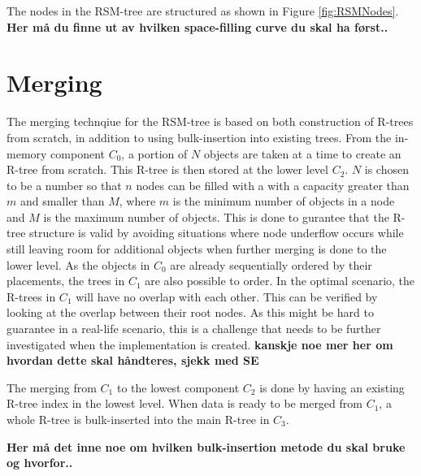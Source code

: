 The nodes in the RSM-tree are structured as shown in Figure \ref{fig:RSMNodes}. \textbf{Her må du finne ut av hvilken space-filling curve du skal ha først..} 

\section{Merging}
\label{RSM-Merging}
The merging technqiue for the RSM-tree is based on both construction of R-trees from scratch, in addition to using bulk-insertion into existing trees. From the in-memory component $C_0$, a portion of $N$ objects are taken at a time to create an R-tree from scratch. This R-tree is then stored at the lower level $C_2$. $N$ is chosen to be a number so that $n$ nodes can be filled with a with a capacity greater than $m$ and smaller than $M$, where $m$ is the minimum number of objects in a node and $M$ is the maximum number of objects. This is done to gurantee that the R-tree structure is valid by avoiding situations where node underflow occurs while still leaving room for additional objects when further merging is done to the lower level. As the objects in $C_0$ are already sequentially ordered by their placements, the trees in $C_1$ are also possible to order. In the optimal scenario, the R-trees in $C_1$ will have no overlap with each other. This can be verified by looking at the overlap between their root nodes. As this might be hard to guarantee in a real-life scenario, this is a challenge that needs to be further investigated when the implementation is created.  \textbf{kanskje noe mer her om hvordan dette skal håndteres, sjekk med SE} \newline

The merging from $C_1$ to the lowest component $C_2$ is done by having an existing R-tree index in the lowest level. When data is ready to be merged from $C_1$, a whole R-tree is bulk-inserted into the main R-tree in $C_3$.

\textbf{Her må det inne noe om hvilken bulk-insertion metode du skal bruke og hvorfor..}